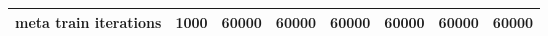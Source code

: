 \begin{tabular}{|l|l|l|l|l|l|l|l|}
meta train iterations                                                                            & 1000                                                                                                             & 60000                                                                                 & 60000                                                                                 & 60000                                                                                  & 60000                                                                                  & 60000                                                                                 & 60000                                                                                 \\ \hline
\end{tabular}
